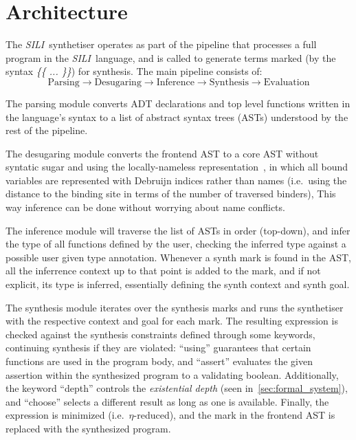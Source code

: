 \documentclass{llncs}
\newcommand{\synname}{\emph{SILI}}
\begin{document}
\section{Architecture}\label{sec:architecture}

The \synname\ synthetiser operates as part of the pipeline that processes a
full program in the \synname\ language, and is called to generate terms marked
(by the syntax \emph{\{\{ ... \}\}}) for
synthesis. The main pipeline consists of:
\[
    \textrm{Parsing} \rightarrow \textrm{Desugaring} \rightarrow
    \textrm{Inference} \rightarrow \textrm{Synthesis} \rightarrow
    \textrm{Evaluation}
\]

The parsing module converts ADT declarations and top level functions written in
the language's syntax to a list of abstract syntax trees (ASTs) understood by the rest of the
pipeline.

The desugaring module converts the frontend AST to a core AST without
syntatic sugar and using the locally-nameless
representation~\cite{locally nameless}, in which all bound variables
are represented with Debruijn indices rather than names (i.e.~using
the distance to the binding site in terms of the number of traversed
binders),
This way inference can be done without worrying about name conflicts.

The inference module will traverse the list of ASTs in order (top-down), and
infer the type of all functions defined by the user, checking the inferred
type against a possible user given type annotation. Whenever a synth mark is
found in the AST, all the inferrence context up to that point is added to the
mark, and if not explicit, its type is inferred, essentially defining the synth
context and synth goal.

The synthesis module iterates over the synthesis marks and runs the synthetiser
with the respective context and goal for each mark. The resulting expression is checked
against the synthesis constraints defined through some keywords, continuing
synthesis if they are violated: ``using'' guarantees that certain functions are
used in the program body, and ``assert'' evaluates the given assertion within the
synthesized program to a validating boolean.  Additionally, the keyword
``depth'' controls the \emph{existential depth} (seen
in~\ref{sec:formal_system}), and ``choose'' selects a different result as long
as one is available. Finally, the expression is minimized (i.e.~$\eta$-reduced),
and the mark in the frontend AST is replaced with the synthesized program. 
\end{document}
